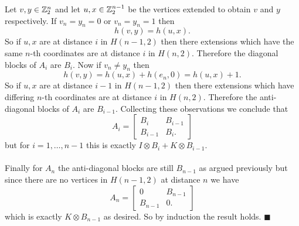 \documentclass[letterpaper,12pt,oneside,onecolumn]{article}
\newcommand{\1}{\mathbbm{1}}
\begin{document}
Let $v, y \in \mathbb{Z}^n_2$ and let $u, x \in \mathbb{Z}^{n-1}_2$ be the vertices extended to obtain $v$ and $y$ respectively. If $v_n = y_n = 0$ or $v_n = y_n = 1$ then
$$h(v,y) = h(u,x).$$
So if $u,x$ are at distance $i$ in $H(n-1,2)$ then there extensions which have the same $n$-th coordinates are at distance $i$ in $H(n,2)$. Therefore the diagonal blocks of $A_i$ are $B_i$. Now if $v_n \neq y_n$ then
$$h(v,y) = h(u,x) + h(e_n, 0) = h(u,x) + 1.$$
So if $u,x$ are at distance $i-1$ in $H(n-1,2)$ then there extensions which have differing $n$-th coordinates are at distance $i$ in $H(n,2)$. Therefore the anti-diagonal blocks of $A_i$ are $B_{i-1}$. Collecting these observations we conclude that
$$A_i = \begin{bmatrix}B_i & B_{i-1} \\ B_{i-1} & B_i. \end{bmatrix}$$
but for $i = 1,\dots,n-1$ this is exactly $I \otimes B_i + K \otimes B_{i-1}$. 
\paragraph{}
Finally for $A_n$ the anti-diagonal blocks are still $B_{n-1}$ as argued previously but since there are no vertices in $H(n-1,2)$ at distance $n$ we have
$$A_n = \begin{bmatrix}0 & B_{n-1} \\ B_{n-1} & 0. \end{bmatrix}$$
which is exactly $K\otimes B_{n-1}$ as desired. So by induction the result holds. $\blacksquare$
\end{document}
